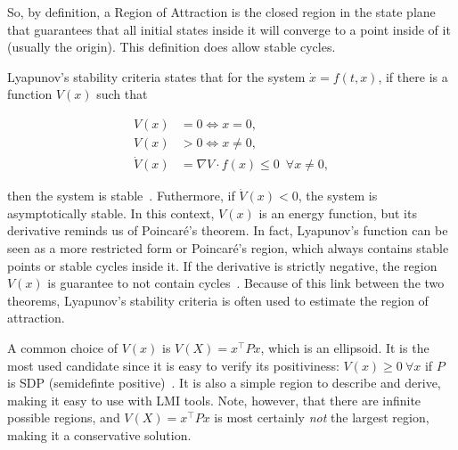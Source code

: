 So, by definition, a Region of Attraction is the closed region in the state
plane that guarantees that all initial states inside it will converge to a point
inside of it (usually the origin). This definition does allow stable cycles.

Lyapunov's stability criteria states that for the system \(\dot{x} = f(t, x)\),
if there is a function \(V(x)\) such that

\begin{align}
  V(x)       & = 0 \iff x = 0,                                           \\
  V(x)       & > 0 \iff x \ne 0,                                         \\
  \dot{V}(x) & = \nabla{}V\cdot{}f(x) \le 0 \phantom{0} \forall x \ne 0,
\end{align}

then the system is stable~\parencite{chen:linear,hespanha:linear}. Futhermore,
if \(\dot{V}(x)<0\), the system is asymptotically stable. In this context,
\(V(x)\) is an energy function, but its derivative reminds us of Poincaré's
theorem. In fact, Lyapunov's function can be seen as a more restricted form or
Poincaré's region, which always contains stable points or stable cycles inside
it. If the derivative is strictly negative, the region \(V(x)\) is guarantee to
not contain cycles~\parencite{chen:linear}. Because of this link between the two
theorems, Lyapunov's stability criteria is often used to estimate the region of
attraction.

A common choice of \(V(x)\) is \(V(X)=x^{\top}Px\), which is an ellipsoid. It is
the most used candidate since it is easy to verify its positiviness:
\(V(x)\ge{}0~\forall{}x\) if \(P\) is SDP (semidefinte
positive)~\parencite{bochnak.coste.ea:real-algebraic-geometry}. It is also a
simple region to describe and derive, making it easy to use with LMI tools.
Note, however, that there are infinite possible regions, and \(V(X)=x^{\top}Px\) is
most certainly \textit{not} the largest region, making it a conservative
solution.
